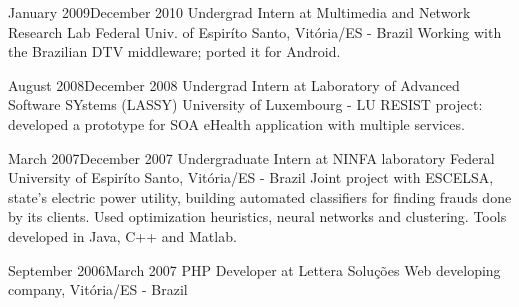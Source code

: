 \documentclass{nirev-cv}
\begin{document}
\workentry
  {January 2009}{December 2010}
  {Undergrad Intern at Multimedia and Network Research Lab}
  {Federal Univ. of Espiríto Santo, Vitória/ES - Brazil}
  {Working with the Brazilian DTV middleware; ported it for Android. }

\workentry
  {August 2008}{December 2008}
  {Undergrad Intern at Laboratory of Advanced Software SYstems (LASSY)}
  {University of Luxembourg - LU}
  {RESIST project: developed a prototype for SOA eHealth application with multiple services.}


\workentry
  {March 2007}{December 2007}
  {Undergraduate Intern at NINFA laboratory}
  {Federal University of Espiríto Santo, Vitória/ES - Brazil}
  {Joint project with ESCELSA, state's electric power utility, building automated classifiers
  for finding frauds done by its clients. Used optimization heuristics, neural networks and clustering.
  Tools developed in Java, C++ and Matlab.}

\workentry
  {September 2006}{March 2007}
  {PHP Developer at Lettera Soluções}
  {Web developing company, Vitória/ES - Brazil}
  {}%

\end{document}

